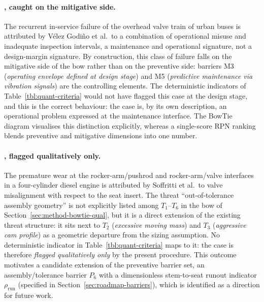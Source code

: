 \paragraph{\citet{velezgodino2019overheadvalvetrain}, caught on
the mitigative side.}
The recurrent in-service failure of the overhead valve train of
urban buses is attributed by V\'elez Godi\~no et al.\ to a
combination of operational misuse and inadequate inspection
intervals, a maintenance and operational signature, not a
design-margin signature. By construction, this class of failure
falls on the mitigative side of the bow rather than on the
preventive side: barriers M3 (\emph{operating envelope defined at
design stage}) and M5 (\emph{predictive maintenance via vibration
signals}) are the controlling elements. The deterministic
indicators of Table~\ref{tbl:quant-criteria} would not have
flagged this case at the design stage, and this is the correct
behaviour: the case is, by its own description, an operational
problem expressed at the maintenance interface. The BowTie diagram
visualises this distinction explicitly, whereas a single-score RPN
ranking blends preventive and mitigative dimensions into one number.

\paragraph{\citet{soffritti2018wornvalvetrain}, flagged
qualitatively only.}
The premature wear at the rocker-arm/pushrod and rocker-arm/valve
interfaces in a four-cylinder diesel engine is attributed by
Soffritti et al.\ to valve misalignment with respect to the seat
insert. The threat ``out-of-tolerance assembly geometry'' is not
explicitly listed among $T_{1}$--$T_{6}$ in the bow of
Section~\ref{sec:method-bowtie-qual}, but it is a direct extension
of the existing threat structure: it sits next to $T_{2}$
(\emph{excessive moving mass}) and $T_{3}$
(\emph{aggressive cam profile}) as a geometric departure from the
sizing assumption. No deterministic indicator in
Table~\ref{tbl:quant-criteria} maps to it: the case is therefore
\emph{flagged qualitatively only} by the present procedure. This
outcome motivates a candidate extension of the preventive barrier
set, an assembly/tolerance barrier $P_{6}$ with a dimensionless
stem-to-seat runout indicator $\rho_{\mathrm{run}}$ (specified in
Section~\ref{sec:roadmap-barriers}), which is identified as a
direction for future work.

